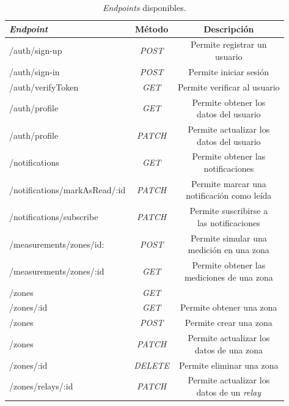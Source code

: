 \begin{table}[H]
	\centering
	\caption[\textit{Endpoints} disponibles]{\textit{Endpoints} disponibles.}
	\begin{tabular}{l c c}    
		\toprule
		\textbf{\emph{Endpoint}} & \textbf{Método} & \textbf{Descripción}\\
		\midrule
		/auth/sign-up & \emph{POST} & \shortstack{Permite registrar un  \\ usuario} \\
		/auth/sign-in & \emph{POST} & Permite iniciar sesión \\
		/auth/verifyToken & \emph{GET} & Permite verificar al usuario \\
		/auth/profile & \emph{GET} & \shortstack{Permite obtener los \\ datos del usuario} \\
		/auth/profile & \emph{PATCH} & \shortstack{Permite actualizar los \\ datos del usuario} \\
		/notifications & \emph{GET} & \shortstack{Permite obtener las \\ notificaciones} \\
		/notifications/markAsRead/:id & \emph{PATCH} & \shortstack{Permite marcar una \\ notificación como leída } \\
		/notifications/subscribe & \emph{PATCH} & \shortstack{Permite suscribirse a \\ las notificaciones } \\
		/measurements/zones/id: & \emph{POST} & \shortstack{Permite simular una \\ medición en una zona} \\
		/measurements/zones/:id & \emph{GET} &  \shortstack{Permite obtener las \\ mediciones de una zona } \\
		/zones & \emph{GET} & \shortstack{Permite obtener las zonas } \\
		/zones/:id & \emph{GET} & Permite obtener una zona \\
		/zones & \emph{POST} & Permite crear una zona \\
		/zones & \emph{PATCH} & \shortstack{Permite actualizar los \\  datos de una zona } \\
		/zones/:id & \emph{DELETE} & Permite eliminar una zona \\
		/zones/relays/:id & \emph{PATCH} & \shortstack{Permite actualizar los \\  datos de un \emph{relay} } \\
		\bottomrule
		\hline
	\end{tabular}
	\label{tab:tablaEndpointsBackend}
\end{table}


